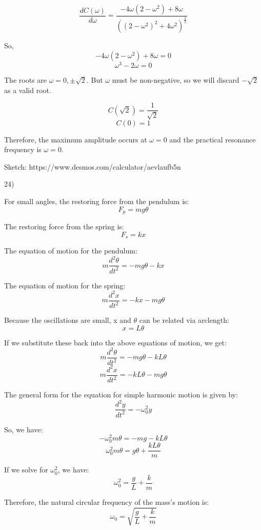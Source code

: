 \documentclass{article}
\begin{document}
\[\frac{d C(\omega)}{d \omega} = \frac{-4 \omega (2 - \omega^2) + 8 \omega}{((2 - \omega^2)^2 + 4 \omega^2)^\frac{3}{2}}\]

So,
\[-4 \omega (2 - \omega^2) + 8 \omega = 0\]
\[\omega^3 - 2 \omega = 0\]

The roots are $\omega = 0, \pm \sqrt{2}$.
But $\omega$ must be non-negative, so we will discard $-\sqrt{2}$
as a valid root.

\[C(\sqrt{2}) = \frac{1}{\sqrt{2}}\]
\[C(0) = 1\]

Therefore, the maximum amplitude occurs at $\omega = 0$
and the practical resonance frequency is $\omega = 0$.


Sketch: https://www.desmos.com/calculator/aevlaufb5n


24)

For small angles, the restoring force from the pendulum is:
\[F_p = m g \theta\]

The restoring force from the spring is:
\[F_s = kx\]

The equation of motion for the pendulum:
\[m \frac{d^2 \theta}{d t^2} = -m g \theta - k x\]

The equation of motion for the spring:
\[m \frac{d^2 x}{d t^2} = -kx -m g \theta\]

Because the oscillations are small, x and $\theta$
can be related via arclength:
\[x = L \theta\]

If we substitute these back into the above equations of motion, we get:
\[m \frac{d^2 \theta}{d t^2} = -m g \theta - k L \theta\]
\[m \frac{d^2 x}{d t^2} = - k L \theta -m g \theta\]

The general form for the equation for simple harmonic motion is given by:
\[\frac{d^2 y}{d t^2} = -\omega_0^2 y\]


So, we have:
\[-\omega_0^2 m \theta = -m g - k L \theta\]
\[\omega_0^2 m \theta = g \theta + \frac{k L \theta}{m}\]

If we solve for $\omega_0^2$, we have:
\[\omega_0^2 = \frac{g}{L} + \frac{k}{m}\]

Therefore, the natural circular frequency of the mass's motion is:
\[\omega_0 = \sqrt{\frac{g}{L} + \frac{k}{m}}\]
\end{document}
